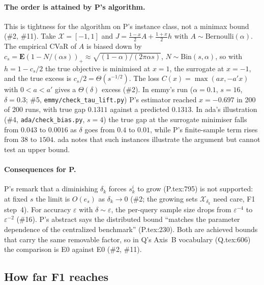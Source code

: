 \documentclass{article}
\newcommand{\E}{\mathbf{E}}
\begin{document}
\paragraph{The order is attained by P's algorithm.} This is tightness for
the algorithm on P's instance class, not a minimax bound (\#2, \#11). Take
$\mathcal X=[-1,1]$ and $J=\frac{1-x}2A+\frac{1+x}2h$ with
$A\sim\mathrm{Bernoulli}(\alpha)$. The empirical CVaR of $A$ is biased
down by $c_s=\E(1-N/(\alpha s))_+\approx\sqrt{(1-\alpha)/(2\pi\alpha s)}$,
$N\sim\mathrm{Bin}(s,\alpha)$, so with $h=1-c_s/2$ the true objective is
minimised at $x=1$, the surrogate at $x=-1$, and the true excess is
$c_s/2=\Theta(s^{-1/2})$. The loss $C(x)=\max(ax,-a'x)$ with $0<a<a'$
gives a $\Theta(\delta)$ excess (\#2). In emmy's run ($\alpha=0.1$,
$s=16$, $\delta=0.3$; \#5, \texttt{emmy/check\_tau\_lift.py}) P's
estimator reached $x=-0.697$ in 200 of 200 runs, with true gap $0.1311$
against a predicted $0.1313$. In ada's illustration (\#4,
\texttt{ada/check\_bias.py}, $s=4$) the true gap at the surrogate
minimiser falls from $0.043$ to $0.0016$ as $\delta$ goes from $0.4$ to
$0.01$, while P's finite-sample term rises from $38$ to $1504$. ada notes
that such instances illustrate the argument but cannot test an upper
bound.

\paragraph{Consequences for P.} P's remark that a diminishing $\delta_k$
forces $s_k^i$ to grow (P.tex:795) is not supported: at fixed $s$ the
limit is $O(e_s)$ as $\delta_k\to0$ (\#2; the growing sets
$\mathcal X_{\delta_k}$ need care, F1 step~4). For accuracy $\varepsilon$
with $\delta\sim\varepsilon$, the per-query sample size drops from
$\varepsilon^{-4}$ to $\varepsilon^{-2}$ (\#16). P's abstract says the
distributed bound ``matches the parameter dependence of the centralized
benchmark'' (P.tex:230). Both are achieved bounds that carry the same
removable factor, so in Q's Axis~B vocabulary (Q.tex:606) the comparison
is E0 against E0 (\#2, \#11).

\subsection{How far F1 reaches}\label{sec:reach}
\end{document}

